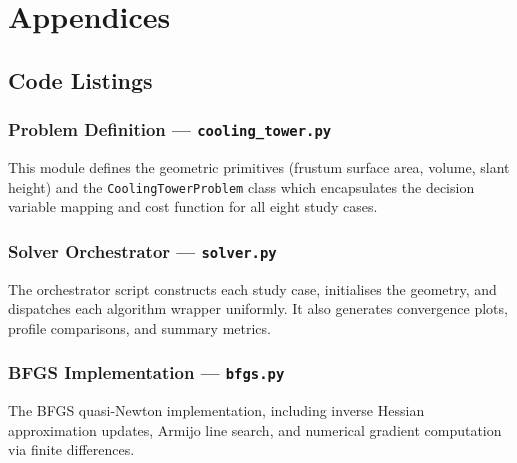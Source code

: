 \clearpage

\section{Appendices}

\appendix

\renewcommand{\thesubsection}{Appendix \Alph{subsection}}
\renewcommand{\thesubsubsection}{Appendix \Alph{subsection}.\Alph{subsubsection}}

\subsection{Code Listings}

\subsubsection{Problem Definition --- \texttt{cooling\_tower.py}}
\label{app:cooling_tower}
This module defines the geometric primitives (frustum surface area, volume, slant height) and the \texttt{CoolingTowerProblem} class which encapsulates the decision variable mapping and cost function for all eight study cases.


\clearpage
\subsubsection{Solver Orchestrator --- \texttt{solver.py}}
\label{app:solver}
The orchestrator script constructs each study case, initialises the geometry, and dispatches each algorithm wrapper uniformly. It also generates convergence plots, profile comparisons, and summary metrics.


\clearpage
\subsubsection{BFGS Implementation --- \texttt{bfgs.py}}
\label{app:bfgs}
The BFGS quasi-Newton implementation, including inverse Hessian approximation updates, Armijo line search, and numerical gradient computation via finite differences.


